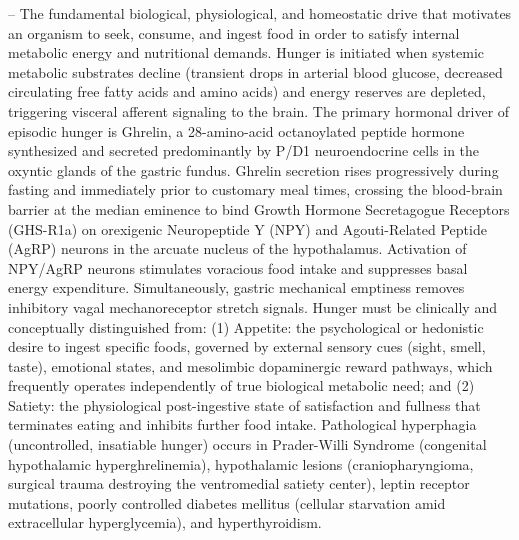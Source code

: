-- The fundamental biological, physiological, and homeostatic drive that motivates an organism to seek, consume, and ingest food in order to satisfy internal metabolic energy and nutritional demands. Hunger is initiated when systemic metabolic substrates decline (transient drops in arterial blood glucose, decreased circulating free fatty acids and amino acids) and energy reserves are depleted, triggering visceral afferent signaling to the brain. The primary hormonal driver of episodic hunger is Ghrelin, a 28-amino-acid octanoylated peptide hormone synthesized and secreted predominantly by P/D1 neuroendocrine cells in the oxyntic glands of the gastric fundus. Ghrelin secretion rises progressively during fasting and immediately prior to customary meal times, crossing the blood-brain barrier at the median eminence to bind Growth Hormone Secretagogue Receptors (GHS-R1a) on orexigenic Neuropeptide Y (NPY) and Agouti-Related Peptide (AgRP) neurons in the arcuate nucleus of the hypothalamus. Activation of NPY/AgRP neurons stimulates voracious food intake and suppresses basal energy expenditure. Simultaneously, gastric mechanical emptiness removes inhibitory vagal mechanoreceptor stretch signals. Hunger must be clinically and conceptually distinguished from: (1) Appetite: the psychological or hedonistic desire to ingest specific foods, governed by external sensory cues (sight, smell, taste), emotional states, and mesolimbic dopaminergic reward pathways, which frequently operates independently of true biological metabolic need; and (2) Satiety: the physiological post-ingestive state of satisfaction and fullness that terminates eating and inhibits further food intake. Pathological hyperphagia (uncontrolled, insatiable hunger) occurs in Prader-Willi Syndrome (congenital hypothalamic hyperghrelinemia), hypothalamic lesions (craniopharyngioma, surgical trauma destroying the ventromedial satiety center), leptin receptor mutations, poorly controlled diabetes mellitus (cellular starvation amid extracellular hyperglycemia), and hyperthyroidism.

